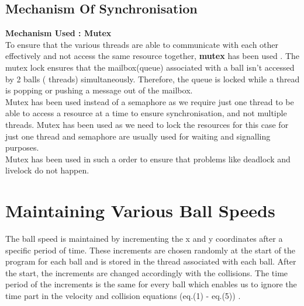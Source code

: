 \documentclass[a4paper]{article}
\begin{document}
\subsection{Mechanism Of Synchronisation}
\textbf{Mechanism Used : Mutex} \\
To ensure that the various threads are able to communicate with each other effectively and not access the same resource together, \textbf{mutex} has been used . The mutex lock ensures that the mailbox(queue) associated with a ball isn't accessed by 2 balls ( threads) simultaneously. Therefore, the queue is locked while a thread is popping or pushing a message out of the mailbox. \\
Mutex has been used instead of a semaphore as we require just one thread to be able to access a resource at a time to ensure synchronisation, and not multiple threads. Mutex has been used as we need to lock the resources for this case for just one thread and semaphore are usually used for waiting and signalling purposes. \\
Mutex has been used in such a order to ensure that problems like deadlock and livelock do not happen.\\
\section{Maintaining Various Ball Speeds}
The ball speed is maintained by incrementing the x and y coordinates after a specific period of time. These increments are chosen randomly at the start of the program for each ball and is stored in the thread associated with each ball. After the start, the increments are changed accordingly with the collisions. The time period of the increments is the same for every ball which enables us to ignore the time part in the velocity and collision equations (eq.(1) - eq.(5)) .
\end{document}
